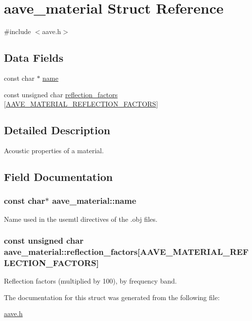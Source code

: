 \hypertarget{structaave__material}{\section{aave\-\_\-material Struct Reference}
\label{structaave__material}
}


{\ttfamily \#include $<$aave.\-h$>$}

\subsection*{Data Fields}
\begin{DoxyCompactItemize}
\item 
const char $\ast$ \hyperlink{structaave__material_af0ba4eaedad26368f33bba9eecddf77a}{name}
\item 
const unsigned char \hyperlink{structaave__material_a8a90deb71af157f83779e7b8d8d4a00f}{reflection\-\_\-factors} \mbox{[}\hyperlink{aave_8h_ad76f6ee2a275c27185c10ff7ea5187b2}{A\-A\-V\-E\-\_\-\-M\-A\-T\-E\-R\-I\-A\-L\-\_\-\-R\-E\-F\-L\-E\-C\-T\-I\-O\-N\-\_\-\-F\-A\-C\-T\-O\-R\-S}\mbox{]}
\end{DoxyCompactItemize}


\subsection{Detailed Description}
Acoustic properties of a material. 

\subsection{Field Documentation}
\hypertarget{structaave__material_af0ba4eaedad26368f33bba9eecddf77a}{
\subsubsection[{name}]{\setlength{\rightskip}{0pt plus 5cm}const char$\ast$ aave\-\_\-material\-::name}}\label{structaave__material_af0ba4eaedad26368f33bba9eecddf77a}
Name used in the usemtl directives of the .obj files. \hypertarget{structaave__material_a8a90deb71af157f83779e7b8d8d4a00f}{
\subsubsection[{reflection\-\_\-factors}]{\setlength{\rightskip}{0pt plus 5cm}const unsigned char aave\-\_\-material\-::reflection\-\_\-factors\mbox{[}{\bf A\-A\-V\-E\-\_\-\-M\-A\-T\-E\-R\-I\-A\-L\-\_\-\-R\-E\-F\-L\-E\-C\-T\-I\-O\-N\-\_\-\-F\-A\-C\-T\-O\-R\-S}\mbox{]}}}\label{structaave__material_a8a90deb71af157f83779e7b8d8d4a00f}
Reflection factors (multiplied by 100), by frequency band. 

The documentation for this struct was generated from the following file\-:\begin{DoxyCompactItemize}
\item 
\hyperlink{aave_8h}{aave.\-h}\end{DoxyCompactItemize}
